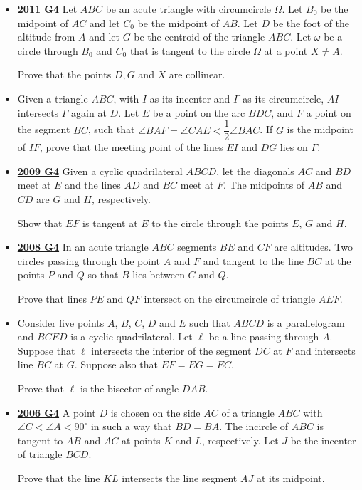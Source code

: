 \documentclass[11pt]{scrartcl}
\begin{document}
\begin{itemize}[leftmargin=*]
Prove that the quadrilateral $BXCY$ is cyclic.
\item \href{https://artofproblemsolving.com/community/c6h488829p2739327}{\textbf{2011 G4}} 	Let $ABC$ be an acute triangle with circumcircle $\Omega$. Let $B_0$ be the midpoint of $AC$ and let $C_0$ be the midpoint of $AB$. Let $D$ be the foot of the altitude from $A$ and let $G$ be the centroid of the triangle $ABC$. Let $\omega$ be a circle through $B_0$ and $C_0$ that is tangent to the circle $\Omega$ at a point $X\not= A$. 

Prove that the points $D,G$ and $X$ are collinear.
\item {}  Given a triangle $ABC$, with $I$ as its incenter and $\Gamma$ as its circumcircle, $AI$ intersects $\Gamma$ again at $D$. Let $E$ be a point on the arc $BDC$, and $F$ a point on the segment $BC$, such that $\angle BAF=\angle CAE < \dfrac12\angle BAC$. If $G$ is the midpoint of $IF$, prove that the meeting point of the lines $EI$ and $DG$ lies on $\Gamma$.
\item \href{https://artofproblemsolving.com/community/c6h355791p1932936}{\textbf{2009 G4}} Given a cyclic quadrilateral $ABCD$, let the diagonals $AC$ and $BD$ meet at $E$ and the lines $AD$ and $BC$ meet at $F$. The midpoints of $AB$ and $CD$ are $G$ and $H$, respectively. 

Show that $EF$ is tangent at $E$ to the circle through the points $E$, $G$ and $H$.
\item \href{https://artofproblemsolving.com/community/c6h287866p1555921}{\textbf{2008 G4}} 	In an acute triangle $ ABC$ segments $ BE$ and $ CF$ are altitudes. Two circles passing through the point $ A$ and $ F$ and tangent to the line $ BC$ at the points $ P$ and $ Q$ so that $ B$ lies between $ C$ and $ Q$. 

Prove that lines $ PE$ and $ QF$ intersect on the circumcircle of triangle $AEF$.
\item {}  Consider five points $ A$, $ B$, $ C$, $ D$ and $ E$ such that $ ABCD$ is a parallelogram and $ BCED$ is a cyclic quadrilateral. Let $ \ell$ be a line passing through $ A$. Suppose that $ \ell$ intersects the interior of the segment $ DC$ at $ F$ and intersects line $ BC$ at $ G$. Suppose also that $ EF = EG = EC$. 

Prove that $ \ell$ is the bisector of angle $ DAB$.
\item \href{https://artofproblemsolving.com/community/c6h149173p842901}{\textbf{2006 G4}} A point $D$ is chosen on the side $AC$ of a triangle $ABC$ with $\angle C < \angle A < 90^\circ$ in such a way that $BD=BA$. The incircle of $ABC$ is tangent to $AB$ and $AC$ at points $K$ and $L$, respectively. Let $J$ be the incenter of triangle $BCD$. 

Prove that the line $KL$ intersects the line segment $AJ$ at its midpoint.
\end{itemize}
\newpage
\end{document}
